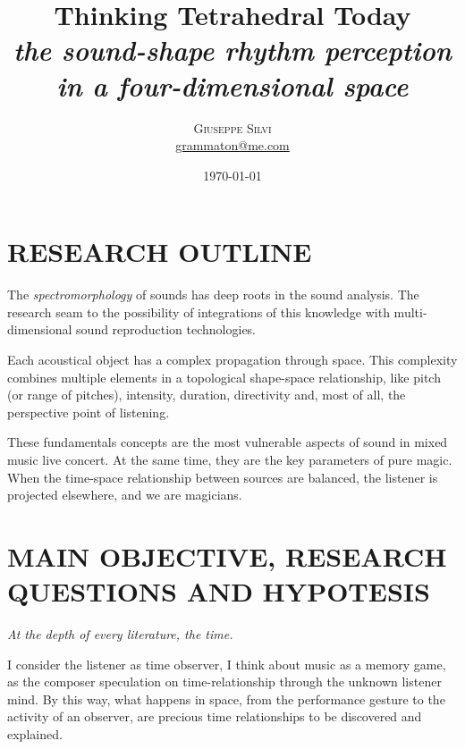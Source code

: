 \documentclass[
	a4paper,
	twocolumn
	]{article}
\title{Thinking Tetrahedral Today \\ \large{\emph{the sound-shape rhythm perception in a four-dimensional space}}} %
\author{%
\textsc{Giuseppe Silvi}\\[1ex]%
\normalsize \href{mailto:me@giuseppesilvi.com}{grammaton@me.com} %
}
\date{\today} %
\begin{document}
\maketitle
\thispagestyle{empty}
\section*{RESEARCH OUTLINE}
The \emph{spectromorphology} of sounds has deep roots in the sound analysis. \cite{smalley_1997} The research seam to the possibility of integrations of this knowledge with multi-dimensional sound reproduction technologies. \cite{gerzon_70a, gerzon_70b, fellgett_75, gerzon_75}

Each acoustical object has a complex propagation through space. This complexity combines multiple elements in a topological shape-space relationship, like pitch (or range of pitches), intensity, duration, directivity and, most of all, the perspective point of listening.

These fundamentals concepts are the most vulnerable aspects of sound in mixed music live concert. At the same time, they are the key parameters of pure magic. When the time-space relationship between sources are balanced, the listener is projected elsewhere, and we are magicians.

\section*{MAIN OBJECTIVE, RESEARCH \\ QUESTIONS AND HYPOTESIS}
%
\emph{At the depth of every literature, the time.}

I consider the listener as time observer, I think about music as a memory game, as the composer speculation on time-relationship through the unknown listener mind. By this way, what happens in space, from the performance gesture to the activity of an observer, are precious time relationships to be discovered and explained.
\end{document}
